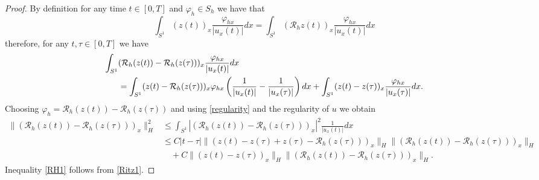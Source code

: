 \documentclass[10pt,a4paper]{amsart}
\begin{document}
\begin{proof}
By definition for any time $t \in [0,T]$ and $\varphi_{h} \in S_{h}$ we have that
$$\int_{S^{1}} (z(t))_{x} \frac{\varphi_{hx}}{|u_{x}(t)|} dx = \int_{S^{1}} ( \mathcal{R}_{h} z(t))_{x} \frac{\varphi_{hx}}{|u_{x}(t)|} dx $$
therefore, for any $t, \tau \in [0,T]$ we have
\begin{align}\label{start}
\int_{S^{1}}& (\mathcal{R}_{h} (z(t)) -\mathcal{R}_{h} (z(\tau)) )_{x} \frac{\varphi_{hx}}{|u_{x}(t)|}dx \\
&= \int_{S^{1}} (z(t) -\mathcal{R}_{h} (z(\tau)) )_{x} \varphi_{hx} \left(\frac{1}{|u_{x}(t)|} - \frac{1}{|u_{x}(\tau)|}\right)dx
+ \int_{S^{1}} (z(t) -z(\tau) )_{x} \frac{\varphi_{hx}}{|u_{x}(\tau)|}dx . \notag
\end{align}
Choosing $\varphi_{h}=\mathcal{R}_{h} (z(t)) -\mathcal{R}_{h} (z(\tau)) $ and using \eqref{regularity} and the regularity of $u$ we obtain
\begin{align*}
\| (\mathcal{R}_{h} (z(t)) -\mathcal{R}_{h} (z(\tau)) )_{x} \|_{H}^{2} &\leq
\int_{S^{1}} |(\mathcal{R}_{h} (z(t)) -\mathcal{R}_{h} (z(\tau)) )_{x}|^{2} \frac{1}{|u_{x}(t)|}dx \\
&\leq C |t -\tau|\| ( z(t) -z(\tau) + z(\tau) -\mathcal{R}_{h} (z(\tau)) )_{x} \|_{H} \| (\mathcal{R}_{h} (z(t)) -\mathcal{R}_{h} (z(\tau)) )_{x} \|_{H}\\
& \quad + C \| (z(t) -z(\tau) )_{x} \|_{H} \| (\mathcal{R}_{h} (z(t)) -\mathcal{R}_{h} (z(\tau)) )_{x} \|_{H}.
\end{align*}
Inequality \eqref{RH1} follows from \eqref{Ritz1}.


\end{proof}
\end{document}
